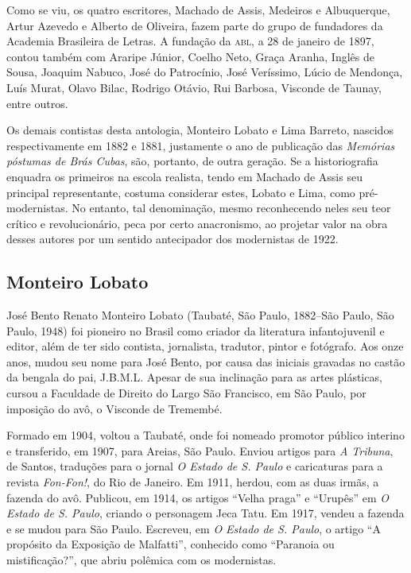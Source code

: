 Como se viu, os quatro escritores, Machado de Assis, Medeiros e
Albuquerque, Artur Azevedo e Alberto de Oliveira, fazem parte do grupo
de fundadores da Academia Brasileira de Letras. A fundação da \textsc{abl}, a 28
de janeiro de 1897, contou também com Araripe Júnior, Coelho
Neto, Graça Aranha, Inglês de Sousa, Joaquim Nabuco, José do Patrocínio,
José Veríssimo, Lúcio de Mendonça, Luís Murat, Olavo Bilac, Rodrigo
Otávio, Rui Barbosa, Visconde de Taunay, entre outros.

Os demais contistas desta antologia, Monteiro Lobato e Lima Barreto,
nascidos respectivamente em 1882 e 1881, justamente o ano de publicação
das \emph{Memórias póstumas de Brás Cubas}, são, portanto, de outra
geração. Se a historiografia enquadra os primeiros na escola realista,
tendo em Machado de Assis seu principal representante, costuma
considerar estes, Lobato e Lima, como pré-modernistas. No entanto, tal
denominação, mesmo reconhecendo neles seu teor crítico e revolucionário,
peca por certo anacronismo, ao projetar valor na obra desses autores por
um sentido antecipador dos modernistas de 1922.

\subsection{Monteiro Lobato}

José Bento Renato Monteiro Lobato (Taubaté, São Paulo, 1882--São Paulo, São Paulo, 1948) foi pioneiro no Brasil como criador da
literatura infantojuvenil e editor, além de ter sido contista,
jornalista, tradutor, pintor e fotógrafo. Aos onze anos, mudou seu nome
para José Bento, por causa das iniciais gravadas no castão da bengala do
pai, J.B.M.L. Apesar de sua inclinação para as artes plásticas, cursou a
Faculdade de Direito do Largo São Francisco, em São Paulo, por imposição
do avô, o Visconde de Tremembé.

Formado em 1904, voltou a Taubaté, onde foi nomeado promotor público
interino e transferido, em 1907, para Areias, São Paulo. Enviou artigos
para \emph{A Tribuna}, de Santos, traduções para o jornal \emph{O Estado
de S. Paulo} e caricaturas para a revista \emph{Fon-Fon!}, do Rio de
Janeiro. Em 1911, herdou, com as duas irmãs, a fazenda do avô. Publicou,
em 1914, os artigos ``Velha praga'' e ``Urupês'' em \emph{O Estado de S.
Paulo}, criando o personagem Jeca Tatu. Em 1917, vendeu a fazenda e se
mudou para São Paulo. Escreveu, em \emph{O Estado de S. Paulo}, o artigo
``A propósito da Exposição de Malfatti'', conhecido como ``Paranoia ou
mistificação?'', que abriu polêmica com os modernistas.

